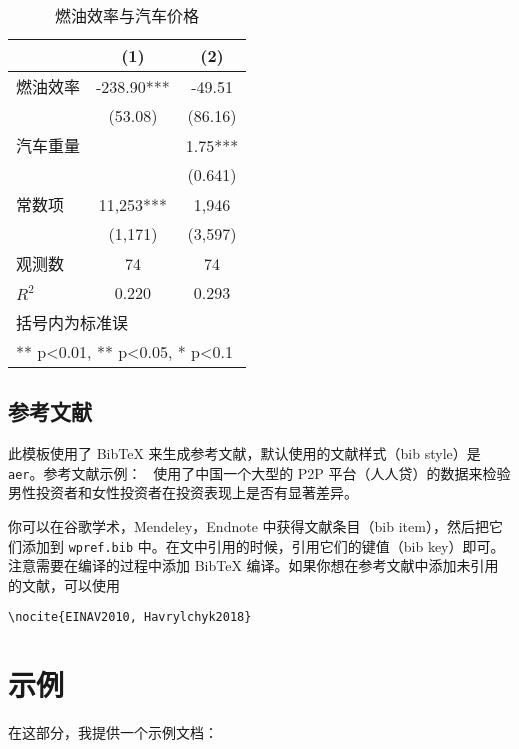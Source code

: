 \documentclass[lang=cn]{elegantpaper}
\begin{document}
\begin{table}[htbp]
  \small
  \centering
  \caption{燃油效率与汽车价格}
    \begin{tabular}{lcc}
    \toprule
                    &       (1)         &        (2)      \\
    \midrule
    燃油效率        &    -238.90***     &      -49.51     \\
                    &     (53.08)       &      (86.16)    \\
    汽车重量        &                   &        1.75***  \\
                    &                   &       (0.641)   \\
    常数项          &  11,253***        &    1,946       \\
                    &  (1,171)          &   (3,597)      \\
    观测数          &      74           &       74        \\
    $R^2$           &       0.220       &        0.293    \\
    \bottomrule
    \multicolumn{3}{l}{\scriptsize 括号内为标准误} \\
    \multicolumn{3}{l}{\scriptsize *** p<0.01, ** p<0.05, * p<0.1} \\
    \end{tabular}%
  \label{tab:reg}%
\end{table}%


\subsection{参考文献}
此模板使用了 Bib\TeX{} 来生成参考文献，默认使用的文献样式（bib style）是 \lstinline{aer}。参考文献示例：~\cite{Chen2018} 使用了中国一个大型的 P2P 平台（人人贷）的数据来检验男性投资者和女性投资者在投资表现上是否有显著差异。

你可以在谷歌学术，Mendeley，Endnote 中获得文献条目（bib item），然后把它们添加到 \lstinline{wpref.bib} 中。在文中引用的时候，引用它们的键值（bib key）即可。注意需要在编译的过程中添加 Bib\TeX{} 编译。如果你想在参考文献中添加未引用的文献，可以使用

\begin{lstlisting}
\nocite{EINAV2010, Havrylchyk2018} 
\end{lstlisting}

\section{示例}
在这部分，我提供一个示例文档：
\end{document}
